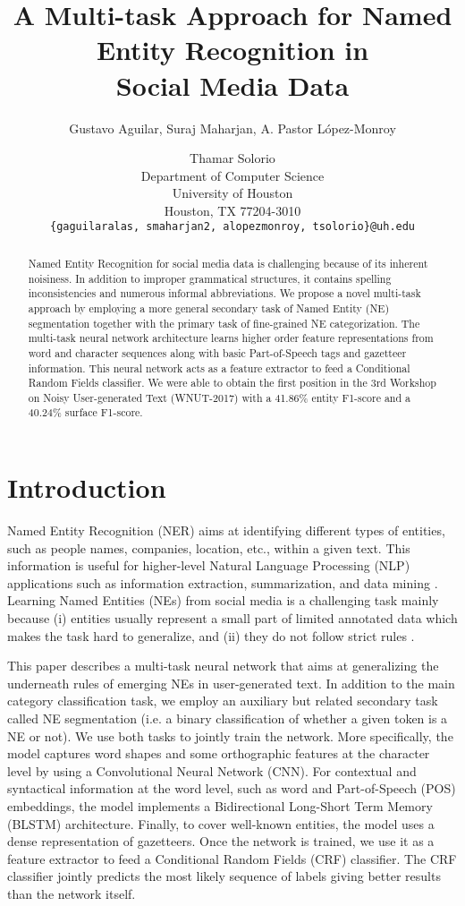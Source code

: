 \documentclass[11pt,letterpaper]{article}
\title{A Multi-task Approach for Named Entity Recognition in \\ Social Media Data}
\author{Gustavo Aguilar, Suraj Maharjan, 
		A. Pastor L\'opez-Monroy \and Thamar Solorio \\
        Department of Computer Science\\
        University of Houston \\
        Houston, TX 77204-3010 \\
  {\tt \{gaguilaralas, smaharjan2, alopezmonroy, tsolorio\}@uh.edu}}
\date{}
\begin{document}
\maketitle

\begin{abstract}
Named Entity Recognition for social media data is challenging because of its inherent noisiness. In addition to improper grammatical structures, it contains spelling inconsistencies and numerous informal abbreviations. We propose a novel multi-task approach by employing a more general secondary task of Named Entity (NE) segmentation together with the primary task of fine-grained NE categorization. The multi-task neural network architecture learns higher order feature representations from word and character sequences along with basic Part-of-Speech tags and gazetteer information. This neural network acts as a feature extractor to feed a Conditional Random Fields classifier. We were able to obtain the first position in the 3rd Workshop on Noisy User-generated Text (WNUT-2017) with a 41.86\% entity F1-score and a 40.24\% surface F1-score. 
	
\end{abstract}

\section{Introduction}

Named Entity Recognition (NER) aims at identifying different types of entities, such as people names, companies, location, etc., within a given text. This information is useful for higher-level Natural Language Processing (NLP) applications such as information extraction, summarization, and data mining \cite{Chen:2004:CDM:987521.987556, Banko:2007:OIE:1625275.1625705, Aramaki:2009:TMT:1572364.1572390}. Learning Named Entities (NEs) from social media is a challenging task mainly because (i) entities usually represent a small part of limited annotated data which makes the task hard to generalize, and (ii) they do not follow strict rules \cite{Ritter:2011:NER:2145432.2145595, Li:2012:TNE:2348283.2348380}. 

This paper describes a multi-task neural network that aims at generalizing the underneath rules of emerging NEs in user-generated text. In addition to the main category classification task, we employ an auxiliary but related secondary task called NE segmentation (i.e. a binary classification of whether a given token is a NE or not). We use both tasks to jointly train the network. More specifically, the model captures word shapes and some orthographic features at the character level by using a Convolutional Neural Network (CNN). For contextual and syntactical information at the word level, such as word and Part-of-Speech (POS) embeddings, the model implements a Bidirectional Long-Short Term Memory (BLSTM) architecture. Finally, to cover well-known entities, the model uses a dense representation of gazetteers. Once the network is trained, we use it as a feature extractor to feed a Conditional Random Fields (CRF) classifier. The CRF classifier jointly predicts the most likely sequence of labels giving better results than the network itself.
\end{document}
